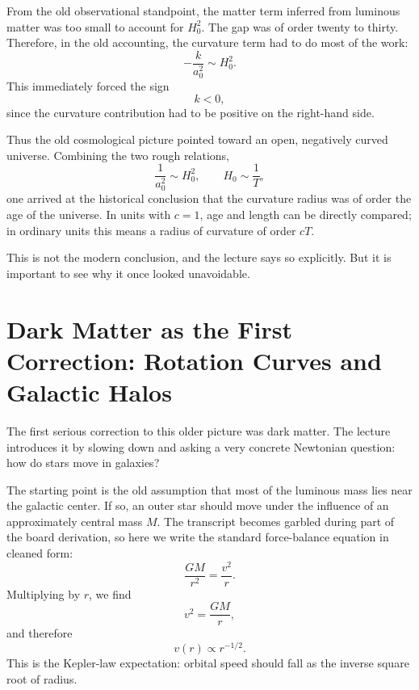 From the old observational standpoint, the matter term inferred from luminous matter was too small to account for \(H_0^2\). The gap was of order twenty to thirty. Therefore, in the old accounting, the curvature term had to do most of the work:
\begin{equation}
-\frac{k}{a_0^2}\sim H_0^2.
\end{equation}
This immediately forced the sign
\begin{equation}
k<0,
\end{equation}
since the curvature contribution had to be positive on the right-hand side.

Thus the old cosmological picture pointed toward an open, negatively curved universe. Combining the two rough relations,
\begin{equation}
\frac{1}{a_0^2}\sim H_0^2,
\qquad
H_0\sim \frac{1}{T},
\end{equation}
one arrived at the historical conclusion that the curvature radius was of order the age of the universe. In units with \(c=1\), age and length can be directly compared; in ordinary units this means a radius of curvature of order \(cT\).

This is not the modern conclusion, and the lecture says so explicitly. But it is important to see why it once looked unavoidable.

\section{Dark Matter as the First Correction: Rotation Curves and Galactic Halos}

The first serious correction to this older picture was dark matter. The lecture introduces it by slowing down and asking a very concrete Newtonian question: how do stars move in galaxies?

The starting point is the old assumption that most of the luminous mass lies near the galactic center. If so, an outer star should move under the influence of an approximately central mass \(M\). The transcript becomes garbled during part of the board derivation, so here we write the standard force-balance equation in cleaned form:
\begin{equation}
\frac{GM}{r^2}=\frac{v^2}{r}.
\end{equation}
Multiplying by \(r\), we find
\begin{equation}
v^2=\frac{GM}{r},
\end{equation}
and therefore
\begin{equation}
v(r)\propto r^{-1/2}.
\end{equation}
This is the Kepler-law expectation: orbital speed should fall as the inverse square root of radius.

